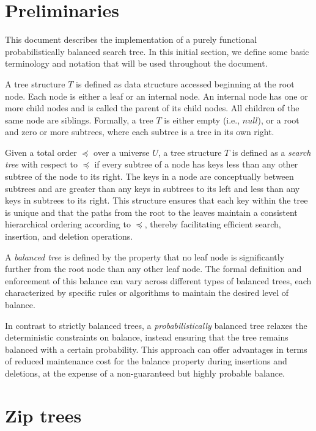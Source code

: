 \documentclass{article}
\begin{document}
\section{Preliminaries}\label{sec:preliminaries}

This document describes the implementation of a purely functional probabilistically balanced search tree. In this initial section, we define some basic terminology and notation that will be used throughout the document.

A tree structure $T$ is defined as data structure accessed beginning at the root node. Each node is either a leaf or an internal node. An internal node has one or more child nodes and is called the parent of its child nodes. All children of the same node are siblings. Formally, a tree $T$ is either empty (i.e., $null$), or a root and zero or more subtrees, where each subtree is a tree in its own right.

Given a total order $\preceq$ over a universe $U$, a tree structure $T$ is defined as a \emph{search tree} with respect to $\preceq$ if every subtree of a node has keys less than any other subtree of the node to its right. The keys in a node are conceptually between subtrees and are greater than any keys in subtrees to its left and less than any keys in subtrees to its right. This structure ensures that each key within the tree is unique and that the paths from the root to the leaves maintain a consistent hierarchical ordering according to $\preceq$, thereby facilitating efficient search, insertion, and deletion operations.

A \emph{balanced tree} is defined by the property that no leaf node is significantly further from the root node than any other leaf node. The formal definition and enforcement of this balance can vary across different types of balanced trees, each characterized by specific rules or algorithms to maintain the desired level of balance.

In contrast to strictly balanced trees, a \emph{probabilistically} balanced tree relaxes the deterministic constraints on balance, instead ensuring that the tree remains balanced with a certain probability. This approach can offer advantages in terms of reduced maintenance cost for the balance property during insertions and deletions, at the expense of a non-guaranteed but highly probable balance.

\section{Zip trees}\label{sec:zip-tree}
\end{document}

